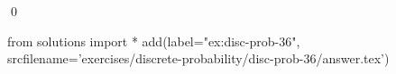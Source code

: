 
\begin{ex} 
  \label{ex:disc-prob-36}
  
  \qed
\end{ex} 
\begin{python0}
from solutions import *
add(label="ex:disc-prob-36",
    srcfilename='exercises/discrete-probability/disc-prob-36/answer.tex') 
\end{python0}
